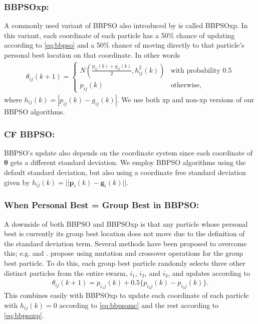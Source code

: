 \documentclass[cmbright]{staauth}
\begin{document}
\subsubsection{BBPSOxp:}
A commonly used variant of BBPSO also introduced by \cite{kennedy2003bare} is called BBPSOxp. In this variant, each coordinate of each particle has a 50\% chance of updating according to \eqref{eq:bbpso} and a 50\% chance of moving directly to that particle's personal best location on that coordinate. In other words
\begin{align}\label{eq:bbpsoxp}
\theta_{ij}(k+1) = \begin{cases} N\left(\frac{p_{ij}(k) + g_{ij}(k)}{2}, h^2_{ij}(k)\right) & \mbox{with probability }0.5\\
p_{ij}(k) &\mbox{otherwise,}\end{cases}
\end{align}
where $h_{ij}(k) = |p_{ij}(k) - g_{ij}(k)|$. We use both xp and non-xp versions of our BBPSO algorithms.

\subsubsection{CF BBPSO:}
BBPSO's update also depends on the coordinate system since each coordinate of $\bm{\theta}$ gets a different standard deviation. We employ BBPSO algorithms using the default standard deviation, but also using a coordinate free standard deviation given by $h_{ij}(k) = ||\bm{p}_i(k) - \bm{g}_i(k)||$.

\subsubsection{When Personal Best = Group Best in BBPSO:}
A downside of both BBPSO and BBPSOxp is that any particle whose personal best is currently its group best location does not move due to the definition of the standard deviation term. Several methods have been proposed to overcome this; e.g. \cite{hsieh2010modified} and \cite{zhang2011novel}. \cite{zhang2011novel} propose using mutation and crossover operations for the group best particle. To do this, each group best particle randomly selects three other distinct particles from the entire swarm, $i_1$, $i_2$, and $i_3$, and updates according to
\begin{align}\label{eq:bbpsomc}
\theta_{ij}(k+1) = p_{i_1j}(k) + 0.5\{p_{i_2j}(k) - p_{i_3j}(k)\}.
\end{align}
This combines easily with BBPSOxp to update each coordinate of each particle with $h_{ij}(k)=0$ according to \eqref{eq:bbpsomc} and the rest according to \eqref{eq:bbpsoxp}.
\end{document}
